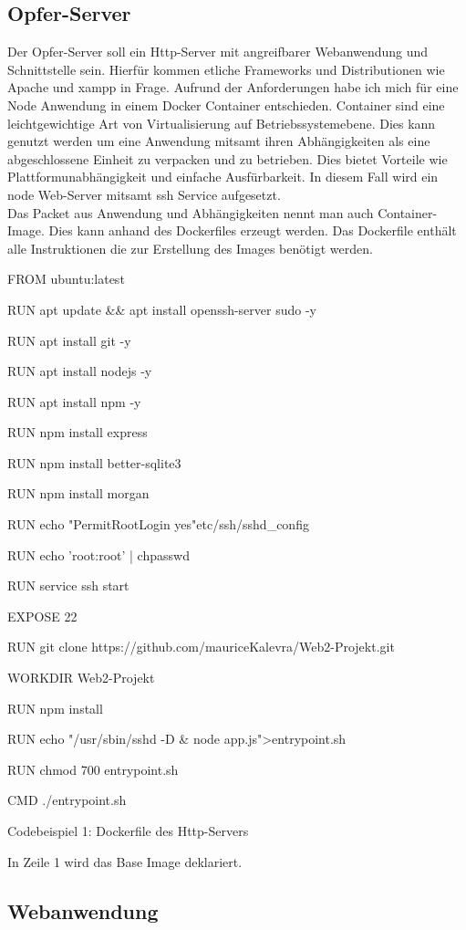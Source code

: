 \documentclass[12pt]{article}
\begin{document}
\subsection{Opfer-Server}
Der Opfer-Server soll ein Http-Server mit angreifbarer Webanwendung und Schnittstelle sein. Hierfür kommen etliche Frameworks und Distributionen wie Apache und xampp in Frage.
Aufrund der Anforderungen habe ich mich für eine Node Anwendung in einem Docker Container entschieden.
Container sind eine leichtgewichtige Art von Virtualisierung auf Betriebssystemebene. Dies kann genutzt werden um eine Anwendung mitsamt ihren Abhängigkeiten als eine abgeschlossene Einheit zu verpacken und zu betrieben. Dies bietet Vorteile wie Plattformunabhängigkeit und einfache Ausfürbarkeit. In diesem Fall wird ein node Web-Server mitsamt ssh Service aufgesetzt.\\
Das Packet aus Anwendung und Abhängigkeiten
nennt man auch Container-Image. Dies kann anhand des Dockerfiles erzeugt werden. Das Dockerfile enthält alle Instruktionen die zur Erstellung des Images benötigt werden.  \\
\begin{shaded}
\begin{internallinenumbers}
FROM ubuntu:latest

RUN apt update \&\& apt install  openssh-server sudo -y

RUN apt install git -y

RUN apt install nodejs -y

RUN apt install npm -y

RUN npm install express

RUN npm install better-sqlite3

RUN npm install morgan

RUN echo "PermitRootLogin yes"\>etc/ssh/sshd\_config

RUN  echo 'root:root' | chpasswd

RUN service ssh start

EXPOSE 22

RUN git clone https://github.com/mauriceKalevra/Web2-Projekt.git

WORKDIR Web2-Projekt

RUN npm install

RUN echo  "/usr/sbin/sshd -D \& node app.js">entrypoint.sh

RUN chmod 700 entrypoint.sh

CMD ./entrypoint.sh
\end{internallinenumbers}
\end{shaded}
\begin{center}
 Codebeispiel 1: Dockerfile des Http-Servers
\end{center}
In Zeile 1 wird das Base Image deklariert.

\subsection{Webanwendung}
\end{document}
